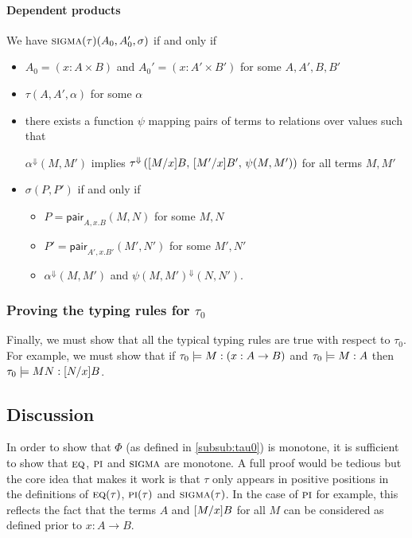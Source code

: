 \documentclass{article} \usepackage{chtt-notes} \usepackage{stmaryrd}
\newcommand{\lift}[1]{{#1}^{\Downarrow}}
\begin{document}
\paragraph{Dependent products}
We have $\textsc{sigma}(\tau)(A_0, A'_0, \sigma)$ if and only if
\begin{itemize}
\item $A_0 = (x:A \times B)$ and $A_0' = (x:A' \times B')$ for some
  $A,A',B,B'$
\item $\tau(A, A', \alpha)$ for some $\alpha$
\item there exists a function $\psi$ mapping pairs of terms to
  relations over values such that
  \begin{center}
    $\lift{\alpha}(M, M')$ implies
    $\lift{\tau}\left(\subst{M}{x}{B}, \, \subst{M'}{x}{B'}, \,
      \psi(M,M')\right)$ for all terms $M, M'$
  \end{center}
\item $\sigma(P, P')$ if and only if
  \begin{itemize}
  \item $P = \textsf{pair}_{A, x.B}(M,N)$ for some $M, N$
  \item $P' = \textsf{pair}_{A', x.B'}(M',N')$ for some $M', N'$
  \item $\lift{\alpha}(M, M')$ and $\lift{\psi(M, M')}(N, N')$.
  \end{itemize}
\end{itemize}

\subsubsection{Proving the typing rules for $\tau_0$}

Finally, we must show that all the typical typing rules are true with
respect to $\tau_0$. For example, we must show that if
$\tau_0 \models \hasEF{M}{(x:A \to B)}$ and
$\tau_0 \models \hasEF{M}{A}$ then
$\tau_0 \models \hasEF{MN}{\subst{N}{x}{B}}$.


\subsection{Discussion}

In order to show that $\Phi$ (as defined in \ref{subsub:tau0}) is
monotone, it is sufficient to show that $\textsc{eq}$, $\textsc{pi}$
and $\textsc{sigma}$ are monotone. A full proof would be tedious but
the core idea that makes it work is that $\tau$ only appears in
positive positions in the definitions of $\textsc{eq}(\tau)$,
$\textsc{pi}(\tau)$ and $\textsc{sigma}(\tau)$.  In the case of
$\textsc{pi}$ for example, this reflects the fact that the terms $A$
and $[M/x]B$ for all $M$ can be considered as defined prior
to $x:A \to B$.
\end{document}
